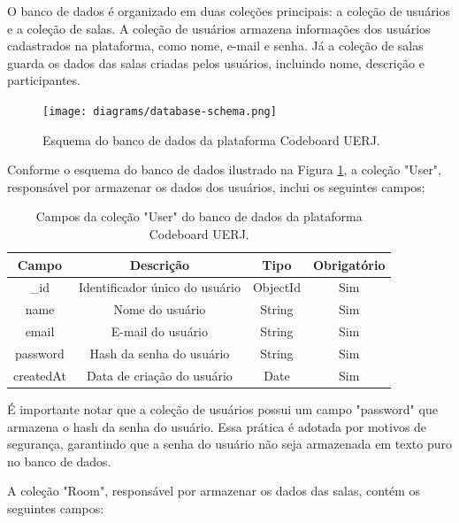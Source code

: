 O banco de dados é organizado em duas coleções principais: a coleção de usuários e a coleção de salas. A coleção de usuários armazena informações dos usuários cadastrados na plataforma, como nome, e-mail e senha. Já a coleção de salas guarda os dados das salas criadas pelos usuários, incluindo nome, descrição e participantes.

\begin{figure}[H]
    \centering
    \texttt{[image: diagrams/database-schema.png]}
    \caption{Esquema do banco de dados da plataforma Codeboard UERJ.}
    \label{fig:database-schema}
\end{figure}

Conforme o esquema do banco de dados ilustrado na Figura \ref{fig:database-schema}, a coleção "User", responsável por armazenar os dados dos usuários, inclui os seguintes campos:

\begin{table}[H]
    \centering
    \begin{tabular}{|c|c|c|c|}
        \hline
        \textbf{Campo} & \textbf{Descrição}             & \textbf{Tipo} & \textbf{Obrigatório} \\
        \hline
        \_id           & Identificador único do usuário & ObjectId      & Sim                  \\
        name           & Nome do usuário                & String        & Sim                  \\
        email          & E-mail do usuário              & String        & Sim                  \\
        password       & Hash da senha do usuário       & String        & Sim                  \\
        createdAt      & Data de criação do usuário     & Date          & Sim                  \\
        \hline
    \end{tabular}
    \caption{Campos da coleção "User" do banco de dados da plataforma Codeboard UERJ.}
    \label{tab:user-collection-fields}
\end{table}

É importante notar que a coleção de usuários possui um campo "password" que armazena o hash da senha do usuário. Essa prática é adotada por motivos de segurança, garantindo que a senha do usuário não seja armazenada em texto puro no banco de dados.

A coleção "Room", responsável por armazenar os dados das salas, contém os seguintes campos:

